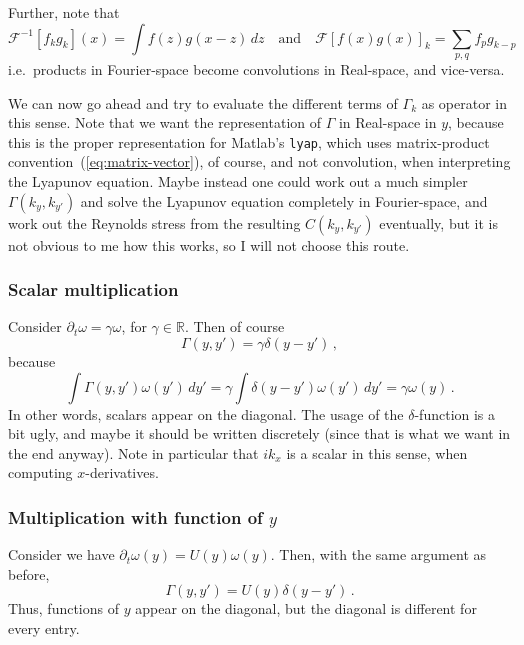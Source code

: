\documentclass[11pt,reqno,a4paper]{amsart}
\newcommand{\RR}{\mathds{R}}
\theoremstyle{definition}
\begin{document}
Further, note that
\begin{equation}
  \label{eq:convolutions}
  \mathcal F^{-1} [f_k g_k](x) = \int f(z) g(x-z)\,dz\quad\text{and}\quad \mathcal F[f(x) g(x)]_k = \sum_{p,q} f_p g_{k-p}
\end{equation}
i.e.~products in Fourier-space become convolutions in Real-space, and
vice-versa.

We can now go ahead and try to evaluate the different terms of
$\Gamma_k$ as operator in this sense. Note that we want the
representation of $\Gamma$ in Real-space in $y$, because this is the
proper representation for Matlab's \texttt{lyap}, which uses
matrix-product convention~(\ref{eq:matrix-vector}), of course, and not
convolution, when interpreting the Lyapunov equation. Maybe instead
one could work out a much simpler $\Gamma(k_y, k_{y'})$ and solve the
Lyapunov equation completely in Fourier-space, and work out the
Reynolds stress from the resulting $C(k_y, k_{y'})$ eventually, but it
is not obvious to me how this works, so I will not choose this route.

\subsubsection{Scalar multiplication}

Consider $\partial_t \omega = \gamma \omega$, for $\gamma \in
\RR$. Then of course
\begin{equation}
  \Gamma(y,y') = \gamma \delta(y-y')\,,
\end{equation}
because
\begin{equation}
  \int \Gamma(y,y') \omega(y')\,dy' = \gamma \int \delta(y-y')
  \omega(y')\,dy' = \gamma \omega(y)\,.
\end{equation}
In other words, scalars appear on the diagonal. The usage of the
$\delta$-function is a bit ugly, and maybe it should be written
discretely (since that is what we want in the end anyway). Note in
particular that $i k_x$ is a scalar in this sense, when computing
$x$-derivatives.

\subsubsection{Multiplication with function of $y$}

Consider we have $\partial_t \omega(y) = U(y) \omega(y)$. Then, with
the same argument as before,
\begin{equation}
  \Gamma(y,y') = U(y) \delta(y-y')\,.
\end{equation}
Thus, functions of $y$ appear on the diagonal, but the diagonal is
different for every entry.
\end{document}

